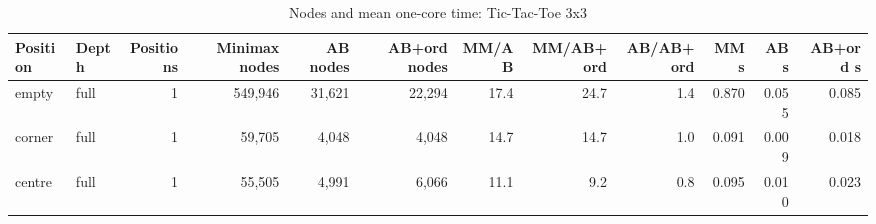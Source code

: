\begin{table}[!t]
\centering
\caption{Nodes and mean one-core time: Tic-Tac-Toe 3x3}
\label{tab:nodes_ttt3}
\small
\begin{tabular}{llrrrrrrrrrr}
\toprule
Position & Depth & Positions & Minimax nodes & AB nodes & AB+ord nodes & MM/AB & MM/AB+ord & AB/AB+ord & MM s & AB s & AB+ord s \\
\midrule
empty & full & 1 & 549,946 & 31,621 & 22,294 & 17.4 & 24.7 & 1.4 & 0.870 & 0.055 & 0.085 \\
corner & full & 1 & 59,705 & 4,048 & 4,048 & 14.7 & 14.7 & 1.0 & 0.091 & 0.009 & 0.018 \\
centre & full & 1 & 55,505 & 4,991 & 6,066 & 11.1 & 9.2 & 0.8 & 0.095 & 0.010 & 0.023 \\
\bottomrule
\end{tabular}
\end{table}
